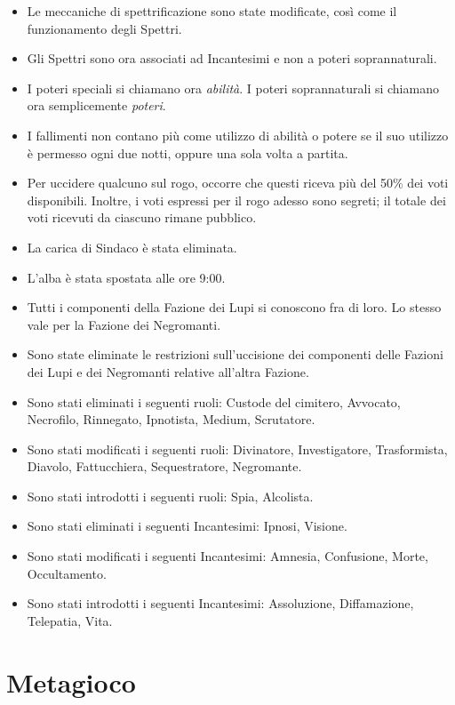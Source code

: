 \documentclass[a4paper,10pt]{article}
\begin{document}
\begin{itemize}
	\item Le meccaniche di spettrificazione sono state modificate, così come il funzionamento degli Spettri.
	\item Gli Spettri sono ora associati ad Incantesimi e non a poteri soprannaturali.
	\item I poteri speciali si chiamano ora \emph{abilità}. I poteri soprannaturali si chiamano ora semplicemente \emph{poteri}.
	\item I fallimenti non contano più come utilizzo di abilità o potere se il suo utilizzo è permesso ogni due notti, oppure una sola volta a partita.
	\item Per uccidere qualcuno sul rogo, occorre che questi riceva più del 50\% dei voti disponibili. Inoltre, i voti espressi per il rogo adesso sono segreti; il totale dei voti ricevuti da ciascuno rimane pubblico.
	\item La carica di Sindaco è stata eliminata.
	\item L'alba è stata spostata alle ore 9:00.
	\item Tutti i componenti della Fazione dei Lupi si conoscono fra di loro. Lo stesso vale per la Fazione dei Negromanti.
	\item Sono state eliminate le restrizioni sull'uccisione dei componenti delle Fazioni dei Lupi e dei Negromanti relative all'altra Fazione.
	\item Sono stati eliminati i seguenti ruoli: Custode del cimitero, Avvocato, Necrofilo, Rinnegato, Ipnotista, Medium, Scrutatore.
	\item Sono stati modificati i seguenti ruoli: Divinatore, Investigatore, Trasformista, Diavolo, Fattucchiera, Sequestratore, Negromante.
	\item Sono stati introdotti i seguenti ruoli: Spia, Alcolista.
	\item Sono stati eliminati i seguenti Incantesimi: Ipnosi, Visione.
	\item Sono stati modificati i seguenti Incantesimi: Amnesia, Confusione, Morte, Occultamento.
	\item Sono stati introdotti i seguenti Incantesimi: Assoluzione, Diffamazione, Telepatia, Vita.
\end{itemize}

\pagebreak

\section{Metagioco}
\end{document}
